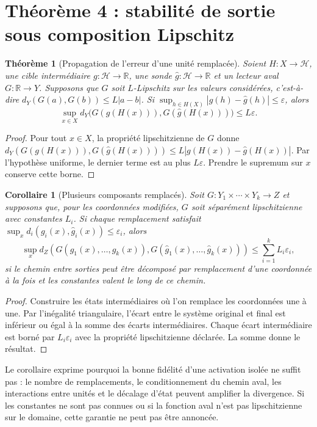 \documentclass[11pt,a4paper,oneside]{report}
\newtheorem{theorem}{Théorème}[chapter]
\newtheorem{corollary}{Corollaire}[chapter]
\newcommand{\R}{\mathbb R}
\newcommand{\Hcal}{\mathcal H}
\begin{document}
\section{Théorème 4 : stabilité de sortie sous composition Lipschitz}
\begin{theorem}[Propagation de l'erreur d'une unité remplacée]
Soient \(H:X\to\Hcal\), une cible intermédiaire \(g:\Hcal\to\R\), une sonde \(\hat g:\Hcal\to\R\) et un lecteur aval \(G:\R\to Y\). Supposons que \(G\) soit \(L\)-Lipschitz sur les valeurs considérées, c'est-à-dire \(d_Y(G(a),G(b))\leq L|a-b|\). Si \(\sup_{h\in H(X)}|g(h)-\hat g(h)|\leq\varepsilon\), alors
\[
\sup_{x\in X}d_Y\bigl(G(g(H(x))),G(\hat g(H(x)))\bigr)\leq L\varepsilon.
\]
\end{theorem}
\begin{proof}
Pour tout \(x\in X\), la propriété lipschitzienne de \(G\) donne \(d_Y(G(g(H(x))),G(\hat g(H(x))))\leq L|g(H(x))-\hat g(H(x))|\). Par l'hypothèse uniforme, le dernier terme est au plus \(L\varepsilon\). Prendre le supremum sur \(x\) conserve cette borne.\end{proof}

\begin{corollary}[Plusieurs composants remplacés]
Soit \(G:Y_1\times\cdots\times Y_k\to Z\) et supposons que, pour les coordonnées modifiées, \(G\) soit séparément lipschitzienne avec constantes \(L_i\). Si chaque remplacement satisfait \(\sup_x d_i(g_i(x),\hat g_i(x))\leq\varepsilon_i\), alors
\[
\sup_x d_Z(G(g_1(x),\ldots,g_k(x)),G(\hat g_1(x),\ldots,\hat g_k(x)))\leq\sum_{i=1}^k L_i\varepsilon_i,
\]
si le chemin entre sorties peut être décomposé par remplacement d'une coordonnée à la fois et les constantes valent le long de ce chemin.
\end{corollary}
\begin{proof}
Construire les états intermédiaires où l'on remplace les coordonnées une à une. Par l'inégalité triangulaire, l'écart entre le système original et final est inférieur ou égal à la somme des écarts intermédiaires. Chaque écart intermédiaire est borné par \(L_i\varepsilon_i\) avec la propriété lipschitzienne déclarée. La somme donne le résultat.\end{proof}

Le corollaire exprime pourquoi la bonne fidélité d'une activation isolée ne suffit pas : le nombre de remplacements, le conditionnement du chemin aval, les interactions entre unités et le décalage d'état peuvent amplifier la divergence. Si les constantes ne sont pas connues ou si la fonction aval n'est pas lipschitzienne sur le domaine, cette garantie ne peut pas être annoncée.
\end{document}
